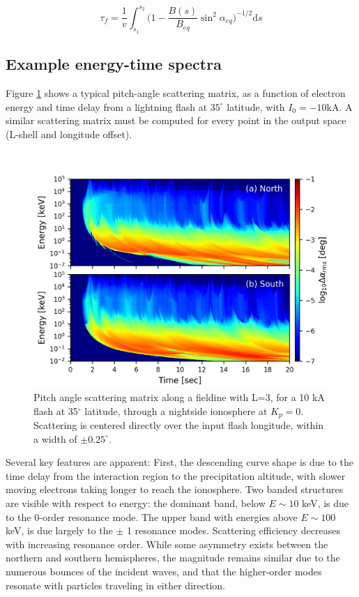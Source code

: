 \begin{equation}
\tau_f =  \frac{1}{v} \int_{s_1}^{s_2} \bigg(1 - \frac{B(s)}{B_{eq}}\sin^2\alpha_{eq}\bigg)^{-1/2} \mathrm{d}s
\label{eqn:bounce_time}
\end{equation}

\subsection{Example energy-time spectra}
Figure \ref{fig:dA_spectra} shows a typical pitch-angle scattering matrix, as a function of electron energy and time delay from a lightning flash at $35^\circ$ latitude, with $I_0=-10$kA. A similar scattering matrix must be computed for every point in the output space (L-shell and longitude offset).

\begin{figure}[h]
\begin{center}
\includegraphics{figures/dA_E-t_spectra.png}
\caption{Pitch angle scattering matrix along a fieldine with L=3, for a 10 kA flash at 35$^\circ$ latitude, through a nightside ionosphere at $K_p=0$. Scattering is centered directly over the input flash longitude, within a width of $\pm0.25^\circ.$}
\label{fig:dA_spectra}
\end{center}
\end{figure}

Several key features are apparent: First, the descending curve shape is due to the time delay from the interaction region to the precipitation altitude, with slower moving electrons taking longer to reach the ionosphere. Two banded structures are visible with respect to energy: the dominant band, below $E \sim 10$ keV, is due to the 0-order resonance mode. The upper band with energies above $E  \sim 100$ keV, is due largely to the $\pm$ 1 resonance modes. Scattering efficiency decreases with increasing resonance order. While some asymmetry exists between the northern and southern hemispheres, the magnitude remains similar due to the numerous bounces of the incident waves, and that the higher-order modes resonate with particles traveling in either direction.

